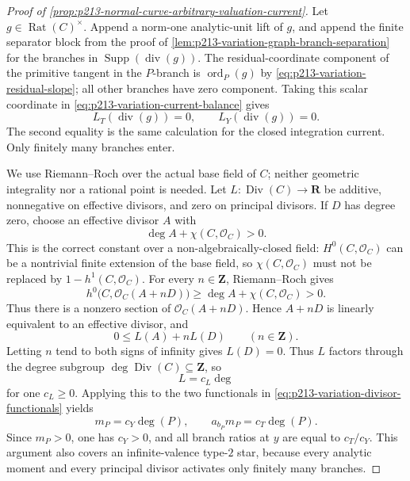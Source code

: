 \begin{proof}[Proof of
\cref{prop:p213-normal-curve-arbitrary-valuation-current}]
Let $g\in\operatorname{Rat}(C)^\times$.  Append a norm-one analytic-unit
lift of $g$, and append the finite separator block from the proof of
\cref{lem:p213-variation-graph-branch-separation} for the branches in
$\operatorname{Supp}(\operatorname{div}(g))$.  The residual-coordinate
component of the primitive tangent in the $P$-branch is
$\operatorname{ord}_P(g)$ by
\eqref{eq:p213-variation-residual-slope}; all other branches have zero
component.  Taking this scalar coordinate in
\eqref{eq:p213-variation-current-balance} gives
\begin{equation}
             L_T(\operatorname{div}(g))=0,
       \qquad L_Y(\operatorname{div}(g))=0.
 \label{eq:p213-variation-principal-zero}
\end{equation}
The second equality is the same calculation for the closed integration
current.  Only finitely many branches enter.

We use Riemann--Roch over the actual base field of $C$; neither geometric
integrality nor a rational point is needed.  Let
$L:\operatorname{Div}(C)\to\mathbf R$ be additive, nonnegative on
effective divisors, and zero on principal divisors.  If $D$ has degree
zero, choose an effective divisor $A$ with
\begin{equation}
                  \deg A+\chi(C,\mathcal O_C)>0.
 \label{eq:p213-variation-rr-positive-constant}
\end{equation}
This is the correct constant over a non-algebraically-closed field:
$H^0(C,\mathcal O_C)$ can be a nontrivial finite extension of the base
field, so $\chi(C,\mathcal O_C)$ must not be replaced by
$1-h^1(C,\mathcal O_C)$.  For every $n\in\mathbf Z$, Riemann--Roch gives
\[
 h^0\bigl(C,\mathcal O_C(A+nD)\bigr)
    \geq \deg A+\chi(C,\mathcal O_C)>0.
\]
Thus there is a nonzero section of
$\mathcal O_C(A+nD)$.  Hence $A+nD$ is linearly equivalent to an
effective divisor, and
\[
                         0\leq L(A)+nL(D)
                         \qquad(n\in\mathbf Z).
\]
Letting $n$ tend to both signs of infinity gives $L(D)=0$.  Thus $L$
factors through the degree subgroup
$\deg\operatorname{Div}(C)\subseteq\mathbf Z$, so
\begin{equation}
                              L=c_L\deg
 \label{eq:p213-variation-degree-factor}
\end{equation}
for one $c_L\geq0$.  Applying this to the two functionals in
\eqref{eq:p213-variation-divisor-functionals} yields
\[
                 m_P=c_Y\deg(P),
       \qquad a_{b_P}m_P=c_T\deg(P).
\]
Since $m_P>0$, one has $c_Y>0$, and all branch ratios at $y$ are equal to
$c_T/c_Y$.  This argument also covers an infinite-valence type-$2$ star,
because every analytic moment and every principal divisor activates only
finitely many branches.


\end{proof}
